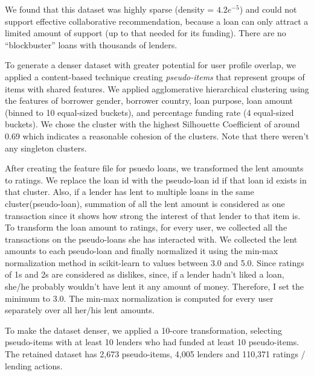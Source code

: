     
    We found that this dataset was highly sparse (density = $4.2e^{-5}$) and could not support effective collaborative recommendation, because a loan can only attract a limited amount of support (up to that needed for its funding). There are no ``blockbuster'' loans with thousands of lenders.
    
    To generate a denser dataset with greater potential for user profile overlap, we applied a content-based technique creating \textit{pseudo-items} that represent groups of items with shared features. We applied agglomerative hierarchical clustering \cite{rokach2005clustering} using the features of borrower gender, borrower country, loan purpose, loan amount (binned to 10 equal-sized buckets), and percentage funding rate (4 equal-sized buckets). We chose the cluster with the highest Silhouette Coefficient \cite{rousseeuw1987silhouettes} of around 0.69 which indicates a reasonable cohesion of the clusters. Note that there weren't any singleton clusters.
    
    After creating the feature file for psuedo loans, we transformed the lent amounts to ratings. We replace the loan id with the pseudo-loan id if that loan id exists in that cluster. Also, if a lender has lent to multiple loans in the same cluster(pseudo-loan), summation of all the lent amount is considered as one transaction since it shows how strong the interest of that lender to that item is.
    To transform the loan amount to ratings, for every user, we collected all the transactions on the pseudo-loans she has interacted with. We collected the lent amounts to each pseudo-loan and finally normalized it using the min-max normalization method in scikit-learn \cite{scikit-learn} to values between 3.0 and 5.0. Since ratings of 1s and 2s are considered as dislikes, since, if a lender hadn't liked a loan, she/he probably wouldn't have lent it any amount of money. Therefore, I set the minimum to 3.0. The min-max normalization is computed for every user separately over all her/his lent amounts.

    To make the dataset denser, we applied a 10-core transformation, selecting pseudo-items with at least 10 lenders who had funded at least 10 pseudo-items. The retained dataset has 2,673 pseudo-items, 4,005 lenders and 110,371 ratings / lending actions.
    

